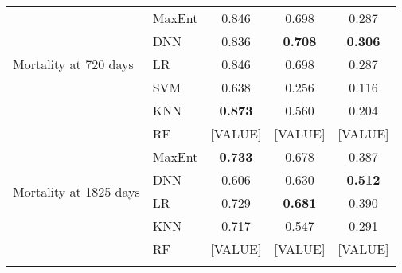 \documentclass{article}
\begin{document}
\begin{table}[htbp]
\begin{tabular}{llccc}
        \hline
        \multirow{5}{*}{Mortality at 720 days} & MaxEnt & 0.846 & 0.698 & 0.287 \\
        & DNN & 0.836 & \textbf{0.708} & \textbf{0.306} \\
        & LR & 0.846 & 0.698 & 0.287 \\
        & SVM & 0.638 & 0.256 & 0.116 \\
        & KNN & \textbf{0.873} & 0.560 & 0.204 \\
        & RF & [VALUE] & [VALUE] & [VALUE] \\
        \hline
        \multirow{4}{*}{Mortality at 1825 days} & MaxEnt & \textbf{0.733} & 0.678 & 0.387 \\
        & DNN & 0.606 & 0.630 & \textbf{0.512} \\
        & LR & 0.729 & \textbf{0.681} & 0.390 \\
        & KNN & 0.717 & 0.547 & 0.291 \\
        & RF & [VALUE] & [VALUE] & [VALUE] \\
        \hline
        \label{tab:final-model-hyperparameters}
        \end{tabular}
        \end{table}
\end{document}
